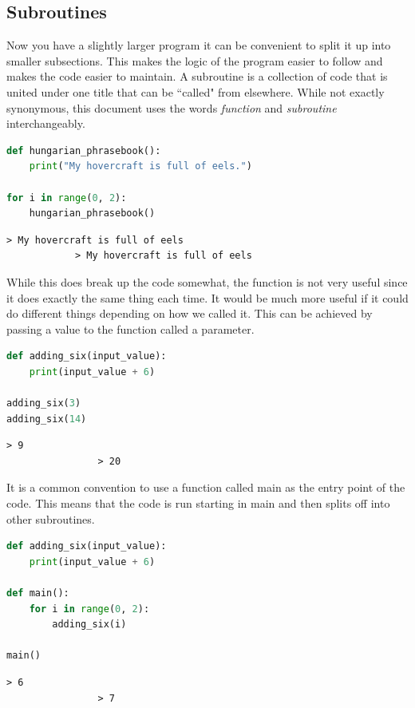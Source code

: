 		\subsection{Subroutines}
			Now you have a slightly larger program it can be convenient to split it up into smaller subsections. This makes the logic of the program easier to follow and makes the code easier to maintain. A subroutine is a collection of code that is united under one title that can be ``called" from elsewhere. While not exactly synonymous, this document uses the words \textit{function} and \textit{subroutine} interchangeably.
			\begin{lstlisting}[language=Python]
def hungarian_phrasebook():
	print("My hovercraft is full of eels.")

for i in range(0, 2):
	hungarian_phrasebook()\end{lstlisting}
			\begin{verbatim}> My hovercraft is full of eels
			> My hovercraft is full of eels
			\end{verbatim}

While this does break up the code somewhat, the function is not very useful since it does exactly the same thing each time. It would be much more useful if it could do different things depending on how we called it. This can be achieved by passing a value to the function called a parameter. 			

			\begin{lstlisting}[language=Python]
def adding_six(input_value):
	print(input_value + 6)

adding_six(3)
adding_six(14)\end{lstlisting}
			\begin{verbatim}> 9
				> 20\end{verbatim}
				
				It is a common convention to use a function called main as the entry point of the code. This means that the code is run starting in main and then splits off into other subroutines.
				
			\begin{lstlisting}[language=Python]
def adding_six(input_value):
	print(input_value + 6)

def main():
	for i in range(0, 2):
		adding_six(i)
		
main()\end{lstlisting}
			\begin{verbatim}> 6
				> 7\end{verbatim}
				
